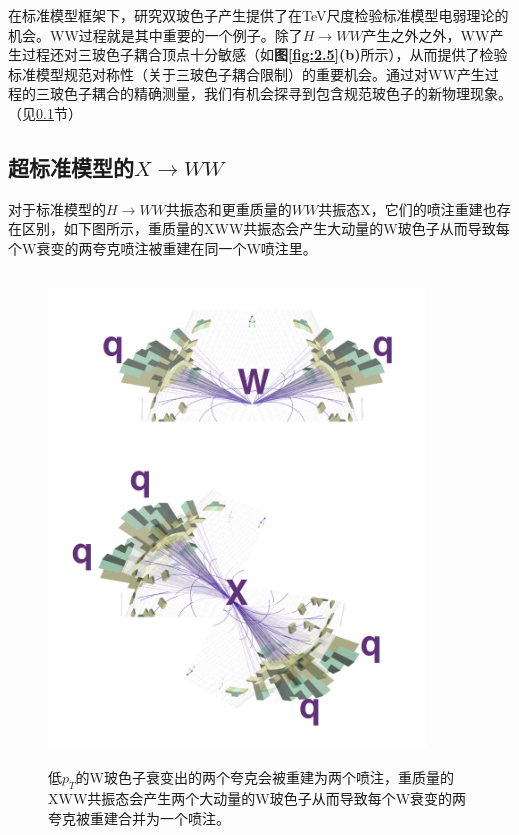 在标准模型框架下，研究双玻色子产生提供了在TeV尺度检验标准模型电弱理论的机会。WW过程就是其中重要的一个例子。除了$H\to WW$产生之外之外，WW产生过程还对三玻色子耦合顶点十分敏感（如\textbf{图\ref{fig:2.5}(b)}所示），从而提供了检验标准模型规范对称性（关于三玻色子耦合限制）的重要机会。通过对WW产生过程的三玻色子耦合的精确测量，我们有机会探寻到包含规范玻色子的新物理现象。（见\ref{sec:2.3.2}节）

\subsection{超标准模型的$X\to WW$}\label{sec:2.3.2}
对于标准模型的$H\to WW$共振态和更重质量的$WW$共振态X，它们的喷注重建也存在区别，如下图所示，重质量的XWW共振态会产生大动量的W玻色子从而导致每个W衰变的两夸克喷注被重建在同一个W喷注里。
\begin{figure}[H]
 \centering
 \includegraphics[height=13cm, width=10cm]{pictures/massiveXWW.png}
  \caption{低$p_T$的W玻色子衰变出的两个夸克会被重建为两个喷注，重质量的XWW共振态会产生两个大动量的W玻色子从而导致每个W衰变的两夸克被重建合并为一个喷注。\cite{Boosting_the_Higgs_boson}}
 \label{fig:2.6}
\end{figure}

